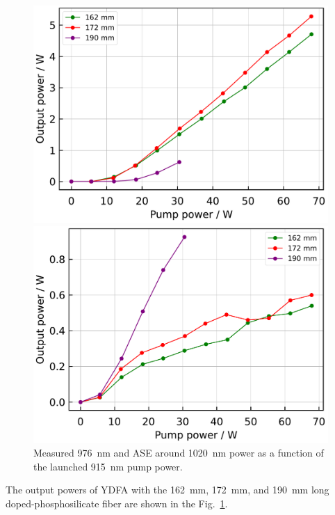 \documentclass{osa-article}
\begin{document}
\begin{figure}[h]
  \begin{minipage}[b]{0.5\linewidth}
    \centering
    \includegraphics[keepaspectratio, width=0.9\linewidth]{./Figure/DCF-YB-20-128P-FAC172mm_SignalComparisonByLength_915Pump976Seed0.24W_Exp}
    \subcaption{}
  \end{minipage}
  \begin{minipage}[b]{0.5\linewidth}
    \centering
    \includegraphics[keepaspectratio, width=0.9\linewidth]{./Figure/DCF-YB-20-128P-FAC172mm_ASEComparisonByLength_915Pump976Seed0.24W_Exp}
    \subcaption{}
  \end{minipage}
  \caption{Measured \SI{976}{\nm} and ASE around \SI{1020}{\nm} power as a function of the launched \SI{915}{\nm} pump power.}
  \label{fig:OutputComparisonOfCORACTIVE976YDFA}
\end{figure}
The output powers of YDFA with the \SI{162}{\mm}, \SI{172}{\mm}, and \SI{190}{\mm} long doped-phosphosilicate fiber are shown in the Fig.~\ref{fig:OutputComparisonOfCORACTIVE976YDFA}.
\end{document}
